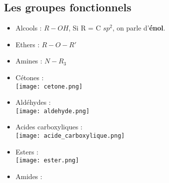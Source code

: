 \documentclass{article}
\begin{document}
    \subsection{Les groupes fonctionnels}
        \begin{itemize}
            \item Alcools : $R-OH$, Si R = C $sp^2$, on parle d'\textbf{énol}.
            \item Ethers : $R-O-R'$
            \item Amines : $N-R_3$
            \item Cétones : \\ \texttt{[image: cetone.png]}
            \item Aldéhydes : \\\texttt{[image: aldehyde.png]}
            \item Acides carboxyliques : \\\texttt{[image: acide\_carboxylique.png]}
            \item Esters : \\\texttt{[image: ester.png]}
            \item Amides : \\
        \end{itemize}
\end{document}
